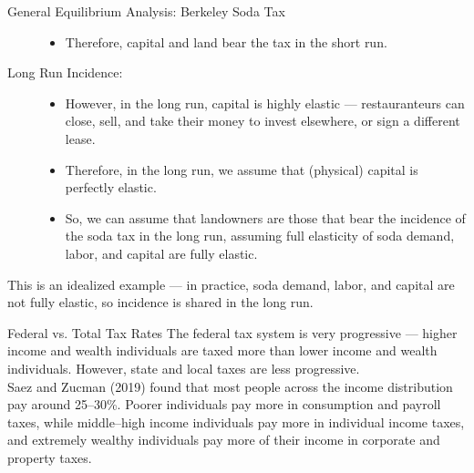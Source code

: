 \documentclass[8pt]{extarticle}
\begin{document}
\begin{problem}{General Equilibrium Analysis: Berkeley Soda Tax}
\begin{description}
\begin{itemize}
          \item Therefore, capital and land bear the tax in the short run.
        \end{itemize}
      \item[Long Run Incidence:]\hfill
        \begin{itemize}
          \item However, in the long run, capital is highly elastic --- restauranteurs can close, sell, and take their money to invest elsewhere, or sign a different lease.
          \item Therefore, in the long run, we assume that (physical) capital is perfectly elastic.
          \item So, we can assume that landowners are those that bear the incidence of the soda tax in the long run, assuming full elasticity of soda demand, labor, and capital are fully elastic.
        \end{itemize}
    \end{description}
    This is an idealized example --- in practice, soda demand, labor, and capital are not fully elastic, so incidence is shared in the long run.
  \end{problem}
  \begin{problem}{Federal vs. Total Tax Rates}
    The federal tax system is very progressive --- higher income and wealth individuals are taxed more than lower income and wealth individuals. However, state and local taxes are less progressive.\\

    Saez and Zucman (2019) found that most people across the income distribution pay around 25--30\%. Poorer individuals pay more in consumption and payroll taxes, while middle--high income individuals pay more in individual income taxes, and extremely wealthy individuals pay more of their income in corporate and property taxes.
  \end{problem}
\end{document}
